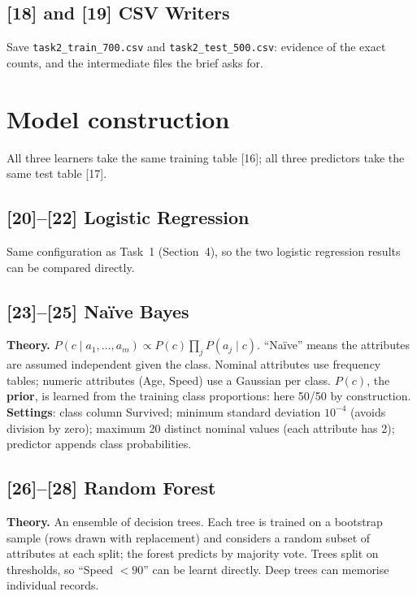 \documentclass[11pt,a4paper]{article}
\newcommand{\cd}[1]{\texttt{#1}}                     %
\begin{document}
\subsection*{[18] and [19] CSV Writers}
Save \cd{task2\_train\_700.csv} and \cd{task2\_test\_500.csv}: evidence of the exact counts, and the
intermediate files the brief asks for.

\section{Model construction}
All three learners take the same training table [16]; all three predictors take the same test table [17].

\subsection*{[20]--[22] Logistic Regression}
Same configuration as Task~1 (Section~4), so the two logistic regression results can be compared directly.

\subsection*{[23]--[25] Naïve Bayes}
\textbf{Theory.} $P(c \mid a_1,\dots,a_m) \propto P(c)\prod_j P(a_j \mid c)$. ``Naïve'' means the attributes are assumed
independent given the class. Nominal attributes use frequency tables; numeric attributes (Age, Speed) use a
Gaussian per class. $P(c)$, the \textbf{prior}, is learned from the training class proportions: here 50/50 by
construction.\\
\textbf{Settings}: class column Survived; minimum standard deviation $10^{-4}$ (avoids division by zero); maximum 20
distinct nominal values (each attribute has 2); predictor appends class probabilities.

\subsection*{[26]--[28] Random Forest}
\textbf{Theory.} An ensemble of decision trees. Each tree is trained on a bootstrap sample (rows drawn with
replacement) and considers a random subset of attributes at each split; the forest predicts by majority vote. Trees
split on thresholds, so ``Speed $< 90$'' can be learnt directly. Deep trees can memorise individual records.
\end{document}

